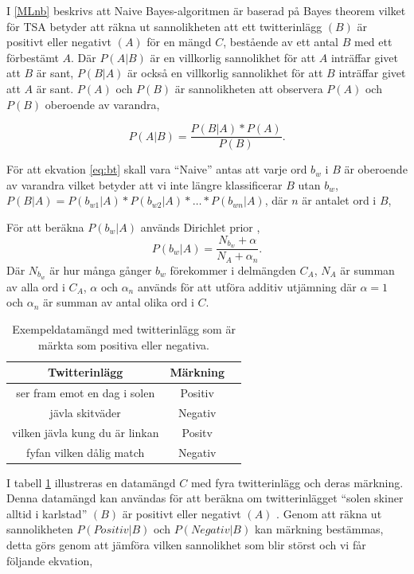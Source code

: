 \documentclass{kaumasters} %
\begin{document}
I \ref{MLnb} beskrivs att Naive Bayes-algoritmen är baserad på Bayes theorem  \cite{wiki:009} vilket för TSA betyder att räkna ut sannolikheten att ett twitterinlägg $(B)$ är positivt eller negativt $(A)$ för en mängd $C$, bestående av ett antal $B$ med ett förbestämt $A$. Där $P(A | B)$ är en villkorlig sannolikhet för att $A$ inträffar givet att $B$ är sant, $P(B | A)$ är också en villkorlig sannolikhet för att $B$ inträffar givet att $A$ är sant. $P(A)$ och $P(B)$ är sannolikheten att observera $P(A)$ och $P(B)$ oberoende av varandra,

\begin{equation}\label{eq:bt}
P(A|B) = \frac{P(B|A) * P(A)}{P(B)}.
\end{equation}

För att ekvation \ref{eq:bt} skall vara “Naive”  antas att varje ord $b_w$ i $B$ är oberoende av varandra vilket betyder att vi inte längre klassificerar $B$ utan $b_w$, $P(B|A) = P(b_{w1}|A) * P(b_{w2}|A) * … * P(b_{wn}|A)$, där $n$ är antalet ord i $B$,

För att beräkna $P(b_w|A)$ används Dirichlet prior \cite{wiki:012, nb:007}, 
\begin{equation}\label{eq:slut}
P(b_w|A)= \frac{N_{b_w} + \alpha}{N_A + \alpha_n}.
\end{equation}
Där $N_{b_w}$ är hur många gånger $b_w$ förekommer i delmängden $C_A$, 
$N_A$ är summan av alla ord i $C_A$, $\alpha$ och $\alpha_n$ används för att utföra additiv utjämning \cite{wiki:013} där $\alpha = 1$ och $\alpha_n$ är summan av antal olika ord i $C$.

\begin{table}[H]
\centering
\caption{Exempeldatamängd med twitterinlägg som är märkta som positiva eller negativa.}
\label{tab:dataset}
    \begin{tabular}{ccc}
    \toprule
    \textbf{Twitterinlägg} & \textbf{Märkning} \\
    \midrule
    ser fram emot en dag i solen & Positiv \\
    jävla skitväder & Negativ \\
    vilken jävla kung du är linkan & Positv \\
    fyfan vilken dålig match & Negativ \\
    \bottomrule
\end{tabular}
\end{table}

I tabell \ref{tab:dataset} illustreras en datamängd $C$ med fyra twitterinlägg och deras märkning. Denna datamängd kan användas för att beräkna om twitterinlägget “solen skiner alltid i karlstad” $(B)$ är positivt eller negativt $(A)$ . Genom att räkna ut sannolikheten $P(Positiv|B)$ och $P(Negativ|B)$ kan märkning bestämmas, detta görs genom att jämföra vilken sannolikhet som blir störst och vi får följande ekvation,
\end{document}
